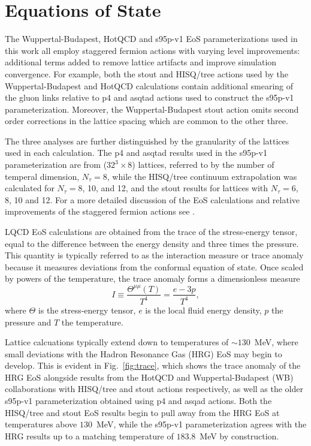 \documentclass[aps,prc,reprint,amsmath,nofootinbib,superscriptaddress]{revtex4-1}
\begin{document}
\section{Equations of State}
\label{eos}

The Wuppertal-Budapest, HotQCD and s95p-v1 EoS parameterizations used in this work all employ staggered fermion actions with varying level improvements: additional terms added to remove lattice artifacts and improve simulation convergence. 
For example, both the stout and HISQ/tree actions used by the Wuppertal-Budapest and HotQCD calculations contain additional smearing of the gluon links relative to p4 and asqtad actions used to construct the s95p-v1 parameterization.
Moreover, the Wuppertal-Budapest stout action omits second order corrections in the lattice spacing which are common to the other three. 

The three analyses are further distinguished by the granularity of the lattices used in each calculation.
The p4 and asqtad results used in the s95p-v1 parameterization are from ($32^3 \times 8$) lattices, referred to by the number of temperal dimension, $N_{\tau}=8$, while the HISQ/tree continuum extrapolation was calculated for $N_{\tau}=8$, 10, and 12, and the stout results for lattices with $N_{\tau}=6$, 8, 10 and 12. 
For a more detailed discussion of the EoS calculations and relative improvements of the staggered fermion actions see \cite{Soltz:2015ula}.

LQCD EoS calculations are obtained from the trace of the stress-energy tensor, equal to the difference between the energy density and three times the pressure. 
This quantity is typically referred to as the interaction measure or trace anomaly  because it measures deviations from the conformal equation of state. 
Once scaled by powers of the temperature, the trace anomaly forms a dimensionless measure 
\begin{equation}
 I \equiv \frac{\Theta^{\mu\mu}(T)}{T^4} = \frac{e - 3p}{T^4},
\end{equation}
where $\Theta$ is the stress-energy tensor, $e$ is the local fluid energy density, $p$ the pressure and $T$ the temperature.

Lattice calcuations typically extend down to temperatures of ${\sim}130$~MeV, where small deviations with the Hadron Resonance Gas (HRG) EoS may begin to develop.
This is evident in Fig.~\ref{fig:trace}, which shows the trace anomaly of the HRG EoS alongside results from the HotQCD and Wuppertal-Budapest (WB) collaborations with HISQ/tree and stout actions respectively, as well as the older s95p-v1 parameterization obtained using p4 and asqad actions.  
Both the HISQ/tree and stout EoS results begin to pull away from the HRG EoS at temperatures above $130$~MeV, while the s95p-v1 parameterization agrees with the HRG results up to a matching temperature of $183.8$~MeV by construction.
\end{document}
